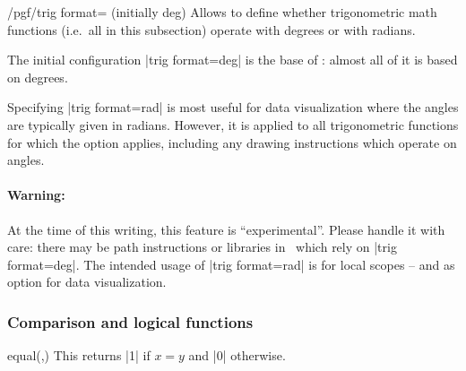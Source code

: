 \begin{key}{/pgf/trig format= (initially deg)}
    Allows to define whether trigonometric math functions (i.e.\ all in this
    subsection) operate with degrees or with radians.
\begin{codeexample}[]
 \pgfmathresult
\end{codeexample}
\begin{codeexample}[]
 \pgfmathresult
\end{codeexample}

    The initial configuration |trig format=deg| is the base of \pgfname: almost
    all of it is based on degrees.

    Specifying |trig format=rad| is most useful for data visualization where
    the angles are typically given in radians. However, it is applied to all
    trigonometric functions for which the option applies, including any drawing
    instructions which operate on angles.
\begin{codeexample}[]
\end{codeexample}

    \paragraph{Warning:}
    At the time of this writing, this feature is ``experimental''. Please
    handle it with care: there may be path instructions or libraries in
    \pgfname\ which rely on |trig format=deg|. The intended usage of
    |trig format=rad| is for local scopes -- and as option for data
    visualization.
\end{key}


\subsubsection{Comparison and logical functions}
\label{pgfmath-functions-comparison}

\begin{math-function}{equal(,)}
\mathcommand
    This returns |1| if $x=y$ and |0| otherwise.
\begin{codeexample}[]
 \pgfmathresult
\end{codeexample}
\end{math-function}

